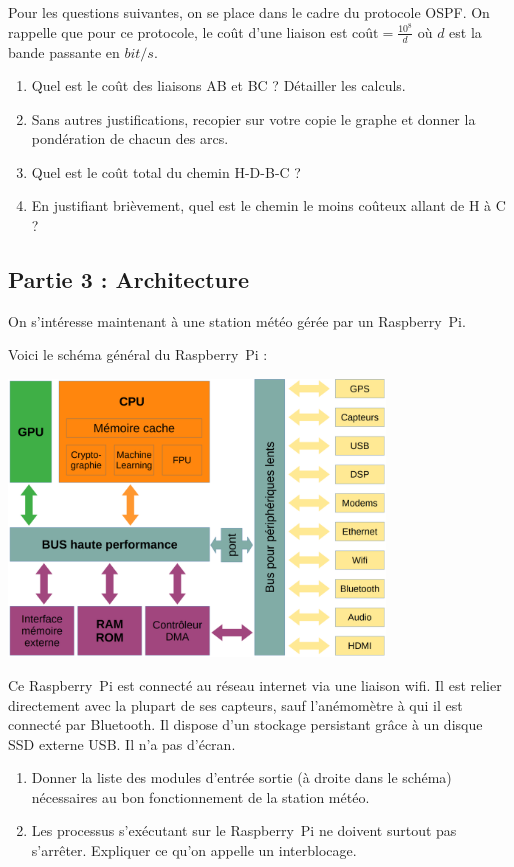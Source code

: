 \documentclass[11pt,a4paper,french,twoside]{PMCours}
\begin{document}
Pour les questions suivantes, on se place dans le cadre du protocole OSPF.
On rappelle que pour ce protocole, le coût d'une liaison est 
$\text{coût}=\frac{10^8}{d}$ où $d$ est la bande passante en $bit/s$.
\begin{enumerate}
    \item Quel est le coût des liaisons AB et BC ? Détailler les calculs.
    \item Sans autres justifications, recopier sur votre copie le graphe et donner la pondération de chacun des arcs. 
    \item Quel est le coût total du chemin H-D-B-C ?
    \item En justifiant brièvement, quel est le chemin le moins coûteux allant de H à C ?
\end{enumerate}

\subsection*{Partie 3 : Architecture}
On s'intéresse maintenant à une station météo gérée par un Raspberry~Pi. 

Voici le schéma général du Raspberry~Pi :
\begin{center}
    \includegraphics[width=10cm]{SchemaSoc.png}
\end{center}

Ce Raspberry~Pi est connecté au réseau internet via une liaison wifi. Il est 
relier directement avec la plupart de ses capteurs, sauf l'anémomètre à qui il 
est connecté par Bluetooth. Il dispose d'un stockage persistant grâce à un
disque SSD externe USB. Il n'a pas d'écran.  

\begin{enumerate}
    \item Donner la liste des modules d'entrée sortie (à droite dans le schéma) 
    nécessaires au bon fonctionnement de la station météo.
    \item Les processus s'exécutant sur le Raspberry~Pi ne doivent surtout pas
    s'arrêter. Expliquer ce qu'on appelle un interblocage.
\end{enumerate}
\end{document}
